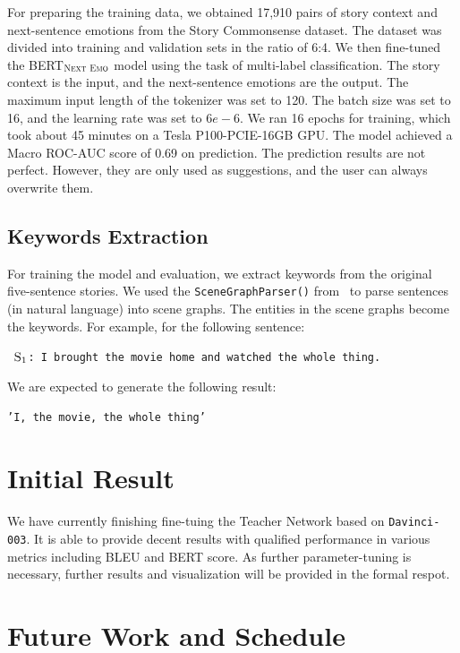 \documentclass[letterpaper]{article}
\begin{document}
For preparing the training data, we obtained 17,910 pairs of story context and next-sentence emotions from the Story Commonsense dataset. The dataset was divided into training and validation sets in the ratio of 6:4. We then fine-tuned the BERT$_{\textsc{Next Emo}}$ model %
using the task of multi-label classification. The story context is the input, and the next-sentence emotions are the output. The maximum input length of the tokenizer was set to 120. The batch size was set to 16, and the learning rate was set to $6e-6$. We ran 16 epochs for training, which took about 45 minutes on a Tesla P100-PCIE-16GB GPU. The model achieved a Macro ROC-AUC score of 0.69 on prediction. The prediction results are not perfect. However, they are only used as suggestions, and the user can always overwrite them. 

\subsection{Keywords Extraction}
For training the model and evaluation, we extract keywords from the original five-sentence stories. We used the \texttt{SceneGraphParser()} from~\cite{wu2019unified} to parse sentences (in natural language) into scene graphs. The entities in the scene graphs become the keywords. For example, for the following sentence: 
\begin{center}
    \texttt{
    $\textsc{S}_1$: I brought the movie home and watched the whole thing.
    }
\end{center}
We are expected to generate the following result:
\begin{center}
    \texttt{'I, the movie, the whole thing'}
\end{center}


\section{Initial Result}
We have currently finishing fine-tuing the Teacher Network based on \texttt{Davinci-003}. It is able to provide decent results with qualified performance in various metrics including BLEU and BERT score. As further parameter-tuning is necessary, further results and visualization will be provided in the formal respot.

\section{Future Work and Schedule}
\end{document}
